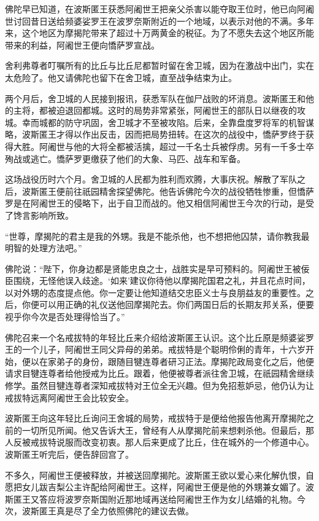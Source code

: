 \documentclass[12pt,twoside,openany]{book}
\begin{document}
佛陀早已知道，在波斯匿王获悉阿阇世王把亲父杀害以能夺取王位时，他已向阿阇世讨回昔日送给频婆娑罗王在波罗奈斯附近的一个地域，以表示对他的不满。多年来，这个地区为摩揭陀带来了超过十万两黄金的税征。为了不愿失去这个地区所能带来的利益，阿阇世王便向憍萨罗宣战。

舍利弗尊者叮嘱所有的比丘与比丘尼都暂时留在舍卫城，因为在激战中出门，实在太危险了。他又请佛陀也留下在舍卫城，直至战争结束为止。

两个月后，舍卫城的人民接到报讯，获悉军队在伽尸战败的坏消息。波斯匿王和他的主将，都被迫退回都城。这时的局势非常紧张，阿阇世王的部队日以继夜的攻城。幸而城都的防守巩固，舍卫城才不至被攻陷。后来，全靠盘度罗将军的机智谋略，波斯匿王才得以作出反击，因而把局势扭转。在这次的战役中，憍萨罗终于获得大胜。阿阇世与他的大将全都被活擒，超过一千名士兵被俘虏。另有一千多士卒殉战或逃亡。憍萨罗更缴获了他们的大象、马匹、战车和军备。

这场战役历时六个月。舍卫城的人民都为胜利而欢腾，大事庆祝。解散了军队之后，波斯匿王便前往祇园精舍探望佛陀。他告诉佛陀今次的战役牺牲惨重，但憍萨罗是在阿阇世王的侵略下，出于自卫而战的。他又相信阿阇世王今次的行动，是受了馋言影响所致。

“世尊，摩揭陀的君主是我的外甥。我是不能杀他，也不想把他囚禁，请你教我最明智的处理方法吧。”

佛陀说：“陛下，你身边都是贤能忠良之士，战胜实是早可预料的。阿阇世王被佞臣围绕，无怪他误入歧途。‘如来’建议你待他以摩揭陀国君之礼，并且花点时间，以对外甥的态度提点他。你一定要让他知道结交忠臣义士与良朋益友的重要性。之后，你便可以用正确的礼仪送他回摩揭陀去。你们两国日后的长期友邦关系，便要视乎你今次是否处理得恰当了。”

佛陀召来一个名戒拔特的年轻比丘来介绍给波斯匿王认识。这个比丘原是频婆娑罗王的一个儿子，阿阇世王同父异母的弟弟。戒拔特是个聪明伶俐的青年，十六岁开始，便以在家弟子的身份，跟随目犍连尊者研习正法。摩揭陀政局变化之后，他便请求目犍连尊者给他授戒为比丘。跟着，他便被尊者派往舍卫城，在祇园精舍继续修学。虽然目犍连尊者深知戒拔特对王位全无兴趣。但为免招惹妒忌，他仍认为让戒拔特远离阿阇世王会比较安全。

波斯匿王向这年轻比丘询问王舍城的局势，戒拔特于是便给他报告他离开摩揭陀之前的一切所见所闻。他又告诉大王，曾经有人从摩揭陀前来想剌杀他。但最后，那人反被戒拔特说服而改变初衷。那人后来更成了比丘，住在城外的一个修道中心。波斯匿王听完后，便告辞回宫了。

不多久，阿阇世王便被释放，并被送回摩揭陀。波斯匿王欲以爱心来化解仇恨，自愿把女儿跋吉梨公主许配给阿阇世王。这样，阿阇世王便是他的外甥兼女媚了。波斯匿王又答应将波罗奈斯国附近那地域再送给阿阇世王作为女儿结婚的礼物。今次，波斯匿王真是尽了全力依照佛陀的建议去做。
\end{document}
